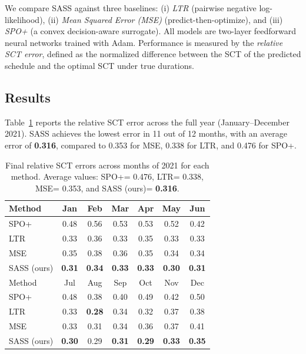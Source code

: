 \documentclass{article}
\begin{document}
We compare SASS against three baselines: (i) \emph{LTR} (pairwise negative log-likelihood), (ii) \emph{Mean Squared Error (MSE)} (predict-then-optimize), and (iii) \emph{SPO+} (a convex decision-aware surrogate).
All models are two-layer feedforward neural networks trained with Adam.
Performance is measured by the \emph{relative SCT error}, defined as the normalized difference between the SCT of the predicted schedule and the optimal SCT under true durations.

\subsection{Results}

Table~\ref{tab:monthly-sct} reports the relative SCT error across the full year (January--December 2021).
SASS achieves the lowest error in 11 out of 12 months, with an average error of \textbf{0.316}, compared to 0.353 for MSE, 0.338 for LTR, and 0.476 for SPO+.

\begin{table}[t]
\centering
\caption{Final relative SCT errors across months of 2021 for each method.
Average values: SPO+= 0.476, LTR= 0.338, MSE= 0.353, and SASS (ours)= \textbf{0.316}.}
\label{tab:monthly-sct}
\begin{tabular}{lcccccc}
\toprule
Method & Jan & Feb & Mar & Apr & May & Jun \\
\midrule
SPO+        & 0.48 & 0.56 & 0.53 & 0.53 & 0.52 & 0.42 \\
LTR         & 0.33 & 0.36 & 0.33 & 0.35 & 0.33 & 0.33 \\
MSE         & 0.35 & 0.38 & 0.36 & 0.35 & 0.34 & 0.34 \\
SASS (ours) & \textbf{0.31} & \textbf{0.34} & \textbf{0.33} & \textbf{0.33} & \textbf{0.30} & \textbf{0.31} \\
\midrule
Method & Jul & Aug & Sep & Oct & Nov & Dec \\
\midrule
SPO+        & 0.48 & 0.38 & 0.40 & 0.49 & 0.42 & 0.50 \\
LTR         & 0.33 & \textbf{0.28} & 0.34 & 0.32 & 0.37 & 0.38 \\
MSE         & 0.33 & 0.31 & 0.34 & 0.36 & 0.37 & 0.41 \\
SASS (ours) & \textbf{0.30} & 0.29 & \textbf{0.31} & \textbf{0.29} & \textbf{0.33} & \textbf{0.35} \\
\bottomrule
\end{tabular}
\end{table}
\end{document}
